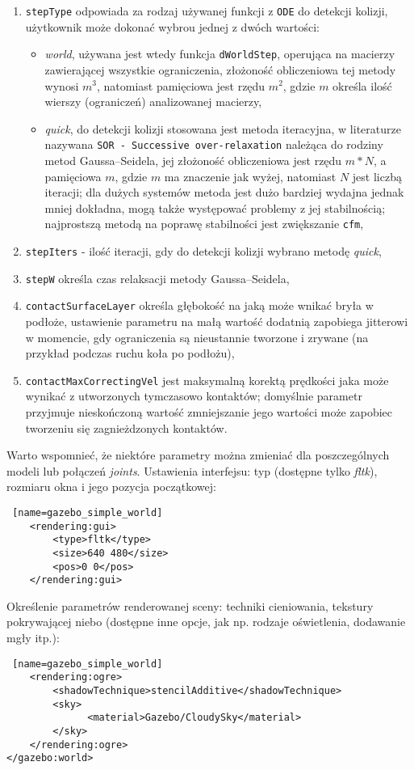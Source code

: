 \begin {enumerate}
	 \item \texttt{stepType} odpowiada za rodzaj używanej funkcji z \texttt{ODE} do detekcji kolizji, użytkownik może dokonać wybrou jednej z dwóch wartości:
	      \begin{itemize}
	       \item \textit{world}, używana jest wtedy funkcja \texttt{dWorldStep}, operująca na macierzy zawierającej wszystkie ograniczenia, złożoność obliczeniowa tej metody wynosi $m^3$, natomiast pamięciowa
jest rzędu $m^2$, gdzie $m$ określa ilość wierszy (ograniczeń) analizowanej macierzy,
	       \item \textit{quick}, do detekcji kolizji stosowana jest metoda iteracyjna, w literaturze nazywana \texttt{SOR - Successive over-relaxation} należąca do rodziny metod Gaussa–Seidela, jej złożoność obliczeniowa jest rzędu $m*N$,
		a pamięciowa $m$, gdzie $m$ ma znaczenie jak wyżej,
		natomiast $N$ jest liczbą iteracji; dla dużych systemów metoda jest dużo bardziej wydajna jednak mniej dokładna, mogą także występować problemy z jej stabilnością; najprostszą metodą na poprawę stabilności
		jest zwiększanie \texttt{cfm}, 
	      \end{itemize}
	 \item \texttt{stepIters} - ilość iteracji, gdy do detekcji kolizji wybrano metodę \textit{quick},
	 \item \texttt{stepW} określa czas relaksacji metody Gaussa–Seidela, 
	 \item \texttt{contactSurfaceLayer} określa głębokość na jaką może wnikać bryła w podłoże, ustawienie parametru na małą wartość dodatnią zapobiega jitterowi w momencie, gdy ograniczenia są nieustannie tworzone
	  i zrywane (na przykład podczas ruchu koła po podłożu),
	 \item \texttt{contactMaxCorrectingVel} jest maksymalną korektą prędkości jaka może wynikać z utworzonych tymczasowo kontaktów; domyślnie parametr przyjmuje nieskończoną wartość zmniejszanie jego
	   wartości może zapobiec tworzeniu się zagnieżdzonych kontaktów. 
	\end {enumerate}
	Warto wspomnieć, że niektóre parametry można zmieniać dla poszczególnych modeli lub połączeń \textit{joints}.\newline
	Ustawienia interfejsu: typ (dostępne tylko \textit{fltk}), rozmiaru okna i jego pozycja początkowej:
\begin{lstlisting} [name=gazebo_simple_world]
    <rendering:gui>
        <type>fltk</type>
        <size>640 480</size>
        <pos>0 0</pos>
    </rendering:gui>
\end{lstlisting}
	Określenie parametrów renderowanej sceny: techniki cieniowania, tekstury pokrywającej niebo (dostępne inne opcje, jak np. rodzaje oświetlenia, dodawanie mgły itp.):
\begin{lstlisting} [name=gazebo_simple_world]
    <rendering:ogre>
        <shadowTechnique>stencilAdditive</shadowTechnique>
        <sky>
              <material>Gazebo/CloudySky</material>
        </sky>
    </rendering:ogre>
</gazebo:world>
\end{lstlisting}

